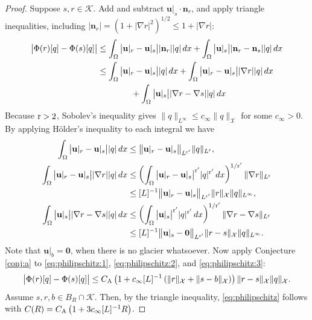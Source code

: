 \documentclass[hidelinks,onefignum,onetabnum,final]{siamart220329}  %
\newcommand{\grad}{\nabla}
\newcommand{\bn}{\mathbf{n}}
\newcommand{\bu}{\mathbf{u}}
\newcommand{\bzero}{\bm{0}}
\newcommand{\cK}{\mathcal{K}}
\newcommand{\cX}{\mathcal{X}}
\newcommand{\rr}{{\text{\textnormal{r}}}}
\newcommand{\CA}{C_\text{\textnormal{A}}}
\begin{document}
\begin{proof}  Suppose $s,r\in\cK$.  Add and subtract $\bu|_s \cdot \bn_r$, and apply triangle inequalities, including $|\bn_r|=\left(1+|\grad r|^2\right)^{1/2} \le 1 + |\grad r|$:
\begin{align}
\big|\Phi(r)[q] - \Phi(s)[q]\big| &\le \int_\Omega \big|\bu|_r - \bu|_s\big| |\bn_r| |q|\,dx + \int_\Omega \big|\bu|_s\big| |\bn_r-\bn_s| |q|\,dx \\
    &\le \int_\Omega \big|\bu|_r - \bu|_s\big| |q|\,dx + \int_\Omega \big|\bu|_r - \bu|_s\big| |\grad r| |q|\,dx \notag \\
    &\qquad\qquad + \int_\Omega \big|\bu|_s\big| |\grad r-\grad s| |q|\,dx \notag
\end{align}
Because $\rr>2$, Sobolev's inequality gives $\|q\|_{L^\infty} \le c_\infty \|q\|_\cX$ for some $c_\infty>0$.  By applying H\"older's inequality to each integral we have
\begin{align}
\int_\Omega \big|\bu|_r - \bu|_s\big| |q|\,dx &\le \big\|\bu|_r - \bu|_s\big\|_{L^{\rr'}} \|q\|_{L^{\rr}}, \label{eq:philipschitz:1} \\
\int_\Omega \big|\bu|_r - \bu|_s\big| |\grad r| |q|\,dx &\le \left(\int_\Omega \big|\bu|_r - \bu|_s\big|^{\rr'} |q|^{\rr'}\, dx\right)^{1/\rr'} \|\grad r\|_{L^\rr} \label{eq:philipschitz:2} \\
    &\le [L]^{-1} \big\|\bu|_r - \bu|_s\big\|_{L^{\rr'}} \|r\|_{\cX} \|q\|_{L^\infty}, \notag \\
\int_\Omega \big|\bu|_s\big| |\grad r-\grad s| |q|\,dx &\le \left(\int_\Omega \big|\bu|_s\big|^{\rr'} |q|^{\rr'}\, dx\right)^{1/\rr'} \|\grad r- \grad s\|_{L^\rr}  \label{eq:philipschitz:3} \\
    &\le [L]^{-1} \big\|\bu|_s - \bzero\big\|_{L^{\rr'}} \|r-s\|_{\cX} \|q\|_{L^\infty}. \notag
\end{align}
Note that $\bu|_b=\bzero$, when there is no glacier whatsoever.  Now apply Conjecture \ref{conj:a} to \eqref{eq:philipschitz:1}, \eqref{eq:philipschitz:2}, and \eqref{eq:philipschitz:3}:
\begin{equation}
\big|\Phi(r)[q] - \Phi(s)[q]\big| \le \CA \left(1 + c_\infty [L]^{-1} \left(\|r\|_{\cX} + \|s - b\|_{\cX}\right)\right) \|r-s\|_{\cX} \|q\|_{\cX}.
\end{equation}
Assume $s,r,b\in B_R\cap \cK$.  Then, by the triangle inequality, \eqref{eq:philipschitz} follows with $C(R) = \CA \left(1 + 3 c_\infty [L]^{-1} R\right)$.
\end{proof}
\end{document}

